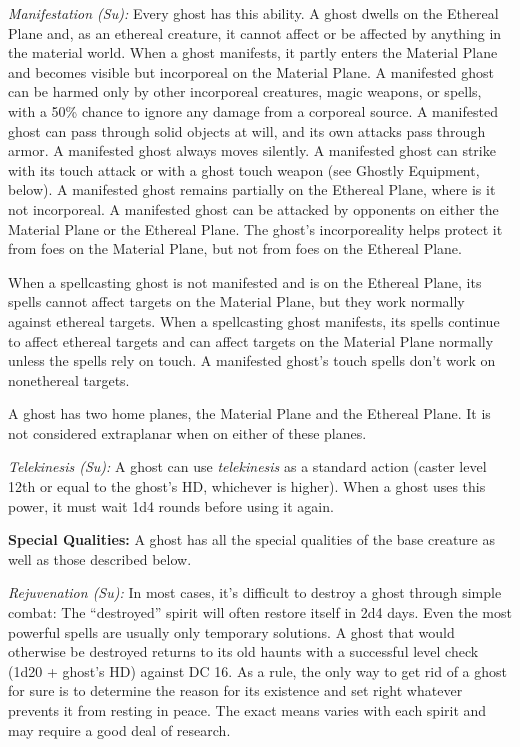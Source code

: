 \documentclass{article}
\begin{document}
\textit{Manifestation (Su): }Every ghost has this ability. A ghost dwells on the 
Ethereal Plane and, as an ethereal creature, it cannot affect or be affected by 
anything in the material world. When a ghost manifests, it partly enters the Material 
Plane and becomes visible but incorporeal on the Material Plane. A manifested ghost 
can be harmed only by other incorporeal creatures, magic weapons, or spells, with 
a 50\% chance to ignore any damage from a corporeal source. A manifested ghost 
can pass through solid objects at will, and its own attacks pass through armor. 
A manifested ghost always moves silently. A manifested ghost can strike with its 
touch attack or with a ghost touch weapon (see Ghostly Equipment, below). A manifested 
ghost remains partially on the Ethereal Plane, where is it not incorporeal. A manifested 
ghost can be attacked by opponents on either the Material Plane or the Ethereal 
Plane. The ghost's incorporeality helps protect it from foes on the Material Plane, 
but not from foes on the Ethereal Plane.

When a spellcasting ghost is not manifested and is on the Ethereal Plane, its spells 
cannot affect targets on the Material Plane, but they work normally against ethereal 
targets. When a spellcasting ghost manifests, its spells continue to affect ethereal 
targets and can affect targets on the Material Plane normally unless the spells 
rely on touch. A manifested ghost's touch spells don't work on nonethereal targets.

A ghost has two home planes, the Material Plane and the Ethereal Plane. It is not 
considered extraplanar when on either of these planes.

\textit{Telekinesis (Su): }A ghost can use \textit{telekinesis }as a standard action 
(caster level 12th or equal to the ghost's HD, whichever is higher). When a ghost 
uses this power, it must wait 1d4 rounds before using it again.

\textbf{Special Qualities:} A ghost has all the special qualities of the base creature 
as well as those described below.

\textit{Rejuvenation (Su): }In most cases, it's difficult to destroy a ghost through 
simple combat: The ``destroyed'' spirit will often restore itself in 2d4 days. 
Even the most powerful spells are usually only temporary solutions. A ghost that 
would otherwise be destroyed returns to its old haunts with a successful level 
check (1d20 + ghost's HD) against DC 16. As a rule, the only way to get rid of 
a ghost for sure is to determine the reason for its existence and set right whatever 
prevents it from resting in peace. The exact means varies with each spirit and 
may require a good deal of research.
\end{document}
